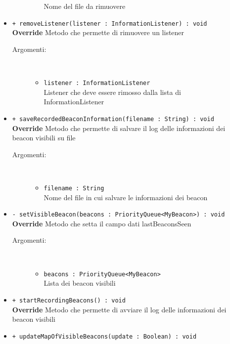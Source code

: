 \documentclass[../DefinizioneDiProdotto.tex]{subfiles}
\begin{document}
\begin{description}
\begin{itemize}
\begin{description}
\begin{itemize}
				Nome del file da rimuovere\end{itemize}
		\end{description}
		\item \texttt{+ removeListener(listener : InformationListener) : void}\\
		\textbf{Override} Metodo che permette di rimuovere un listener
		\begin{description}
			\item[Argomenti:] \
			\begin{itemize}
				\item \texttt{listener : InformationListener}\\
				Listener che deve essere rimosso dalla lista di InformationListener\end{itemize}
		\end{description}
		\item \texttt{+ saveRecordedBeaconInformation(filename : String) : void}\\
		\textbf{Override} Metodo che permette di salvare il log delle informazioni dei beacon visibili su file
		\begin{description}
			\item[Argomenti:] \
			\begin{itemize}
				\item \texttt{filename : String}\\
				Nome del file in cui salvare le informazioni dei beacon\end{itemize}
		\end{description}
		\item \texttt{- setVisibleBeacon(beacons : PriorityQueue<MyBeacon>) : void}\\
		\textbf{Override} Metodo che setta il campo dati lastBeaconsSeen
		\begin{description}
			\item[Argomenti:] \
			\begin{itemize}
				\item \texttt{beacons : PriorityQueue<MyBeacon>}\\
				Lista dei beacon visibili\end{itemize}
		\end{description}
		\item \texttt{+ startRecordingBeacons() : void}\\
		\textbf{Override} Metodo che permette di avviare il log delle informazioni dei beacon visibili
		\item \texttt{+ updateMapOfVisibleBeacons(update : Boolean) : void}\\

\end{itemize}
\end{description}
\end{document}
